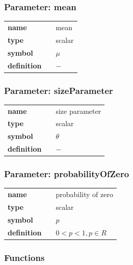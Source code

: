 \subsubsection*{Parameter: mean}

\noindent\begin{tabular}{p{2cm}cl}
\textbf{name} & & mean \\
\textbf{type} & & scalar \\
\textbf{symbol} & & $\mu$  \\
\textbf{definition} & & $-$
\end{tabular}

\subsubsection*{Parameter: sizeParameter}

\noindent\begin{tabular}{p{2cm}cl}
\textbf{name} & & size parameter \\
\textbf{type} & & scalar \\
\textbf{symbol} & & $\theta$  \\
\textbf{definition} & & $-$
\end{tabular}
\subsubsection*{Parameter: probabilityOfZero}

\noindent\begin{tabular}{p{2cm}cl}
\textbf{name} & & probability of zero \\
\textbf{type} & & scalar \\
\textbf{symbol} & & $p$  \\
\textbf{definition} & & $0<p<1, p \in R$
\end{tabular}
\subsubsection*{Functions}

